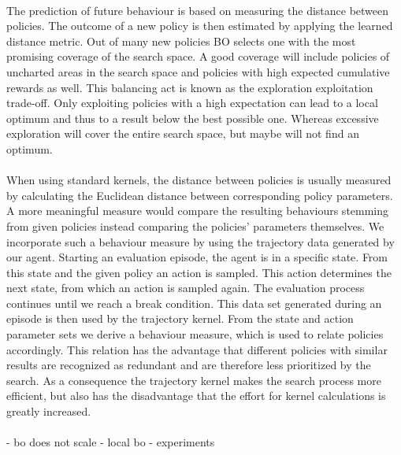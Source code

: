\\
The prediction of future behaviour is based on measuring the distance between policies. The outcome of a new policy is then estimated by applying the learned distance metric. Out of many new policies BO selects one with the most promising coverage of the search space. A good coverage will include policies of uncharted areas in the search space and policies with high expected cumulative rewards as well. This balancing act is known as the exploration exploitation trade-off. Only exploiting policies with a high expectation can lead to a local optimum and thus to a result below the best possible one. Whereas excessive exploration will cover the entire search space, but maybe will not find an optimum.\\
\\
When using standard kernels, the distance between policies is usually measured by calculating the Euclidean distance between corresponding policy parameters. A more meaningful measure would compare the resulting behaviours stemming from given policies instead comparing the policies' parameters themselves. We incorporate such a behaviour measure by using the trajectory data generated by our agent. Starting an evaluation episode, the agent is in a specific state. From this state and the given policy an action is sampled. This action determines the next state, from which an action is sampled again. The evaluation process continues until we reach a break condition. This data set generated during an episode is then used by the trajectory kernel. From the state and action parameter sets we derive a behaviour measure, which is used to relate policies accordingly. This relation has the advantage that different policies with similar results are recognized as redundant and are therefore less prioritized by the search. As a consequence the trajectory kernel makes the search process more efficient, but also has the disadvantage that the effort for kernel calculations is greatly increased.\\
\\

- bo does not scale
- local bo
- experiments \cite{sutton1998reinforcement}

